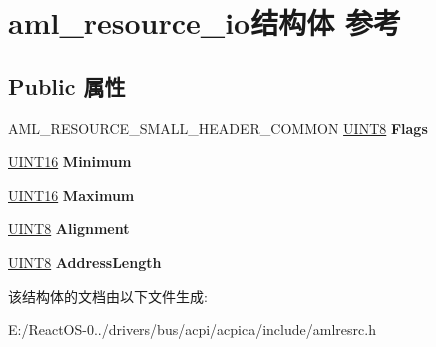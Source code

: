\hypertarget{structaml__resource__io}{}\section{aml\+\_\+resource\+\_\+io结构体 参考}
\label{structaml__resource__io}
\subsection*{Public 属性}
\begin{DoxyCompactItemize}
\item 
\mbox{\label{structaml__resource__io_a51505890666fa3bae40e047e5c96e35c}} 
A\+M\+L\+\_\+\+R\+E\+S\+O\+U\+R\+C\+E\+\_\+\+S\+M\+A\+L\+L\+\_\+\+H\+E\+A\+D\+E\+R\+\_\+\+C\+O\+M\+M\+ON \hyperlink{_processor_bind_8h_ab27e9918b538ce9d8ca692479b375b6a}{U\+I\+N\+T8} {\bfseries Flags}
\item 
\mbox{\label{structaml__resource__io_a090b583ebc4947c0b6a6f634e07ebb19}} 
\hyperlink{_processor_bind_8h_a09f1a1fb2293e33483cc8d44aefb1eb1}{U\+I\+N\+T16} {\bfseries Minimum}
\item 
\mbox{\label{structaml__resource__io_a01aa95d0f193e741f80abf657de2e9c4}} 
\hyperlink{_processor_bind_8h_a09f1a1fb2293e33483cc8d44aefb1eb1}{U\+I\+N\+T16} {\bfseries Maximum}
\item 
\mbox{\label{structaml__resource__io_a012ed4ae1fdf3788087d1473fdceeb18}} 
\hyperlink{_processor_bind_8h_ab27e9918b538ce9d8ca692479b375b6a}{U\+I\+N\+T8} {\bfseries Alignment}
\item 
\mbox{\label{structaml__resource__io_acccebba9e9b64565b31adb33418f395c}} 
\hyperlink{_processor_bind_8h_ab27e9918b538ce9d8ca692479b375b6a}{U\+I\+N\+T8} {\bfseries Address\+Length}
\end{DoxyCompactItemize}


该结构体的文档由以下文件生成\+:\begin{DoxyCompactItemize}
\item 
E\+:/\+React\+O\+S-\/0../drivers/bus/acpi/acpica/include/amlresrc.\+h\end{DoxyCompactItemize}

